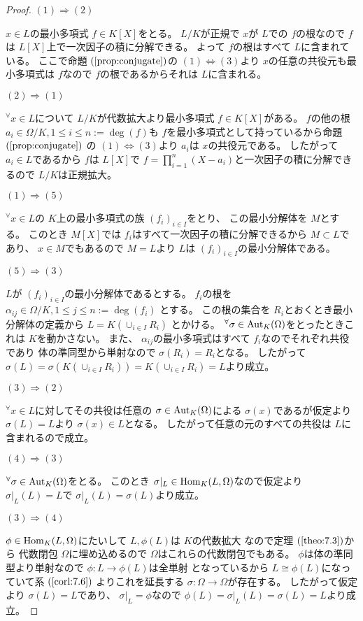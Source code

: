 \documentclass[../master_galois_theory]{subfiles}
\begin{document}
\begin{proof}
  $(1) \Rightarrow (2)$

  $x \in L$の最小多項式 $f \in K[X]$をとる。
  $L/K$が正規で $x$が $L$での $f$の根なので
  $f$は $L[X]$上で一次因子の積に分解できる。
  よって $f$の根はすべて $L$に含まれている。
  ここで命題 $(\mathrm{\ref{prop:conjugate}})$の $(1) \Leftrightarrow (3)$より
  $x$の任意の共役元も最小多項式は $f$なので $f$の根であるからそれは $L$に含まれる。

  $(2) \Rightarrow (1)$

  ${}^\forall x \in L$について $L/K$が代数拡大より最小多項式 $f \in K[X]$がある。
  $f$の他の根 $a_i \in \Omega/K , 1 \leq i \leq n := \deg(f)$も
  $f$を最小多項式として持っているから命題 $(\mathrm{\ref{prop:conjugate}})$
  の $(1) \Leftrightarrow (3)$より $a_i$は $x$の共役元である。
  したがって $a_i \in L$であるから $f$は $L[X]$で $f = \prod_{i=1}^n (X - a_i)$と一次因子の積に分解できるので $L/K$は正規拡大。

  $(1) \Rightarrow (5)$

  ${}^\forall x \in L$の $K$上の最小多項式の族 $(f_i)_{i \in I}$をとり、
  この最小分解体を $M$とする。
  このとき $M[X]$では $f_i$はすべて一次因子の積に分解できるから
  $M \subset L$であり、 $x \in M$でもあるので $M = L$より
  $L$は $(f_i)_{i \in I}$の最小分解体である。

  $(5) \Rightarrow (3)$

  $L$が $(f_i)_{i \in I}$の最小分解体であるとする。
  $f_i$の根を $\alpha_{ij} \in \Omega/K , 1 \leq j \leq n := \deg(f_i)$
  とする。
  この根の集合を $R_i$とおくとき最小分解体の定義から $L = K(\cup_{i \in I} R_i)$
  とかける。
  ${}^\forall \sigma \in \mathrm{Aut}_K(\Omega)$をとったときこれは $K$を動かさない。
  また、 $\alpha_{ij}$の最小多項式はすべて $f_i$なのでそれぞれ共役であり
  体の準同型から単射なので $\sigma(R_i) = R_i$となる。
  したがって $\sigma(L) = \sigma(K(\cup_{i \in I}R_i)) = K(\cup_{i \in I}R_i) = L$より成立。

  $(3) \Rightarrow (2)$

  ${}^\forall x \in L$に対してその共役は任意の $\sigma \in \mathrm{Aut}_K(\Omega)$による $\sigma(x)$であるが仮定より $\sigma(L) = L$より $\sigma(x) \in L$となる。
  したがって任意の元のすべての共役は $L$に含まれるので成立。

  $(4) \Rightarrow (3)$

  ${}^\forall \sigma \in \mathrm{Aut}_K(\Omega)$をとる。
  このとき $\sigma|_L \in \mathrm{Hom}_K(L,\Omega)$なので仮定より
  $\sigma|_L(L) = L$で $\sigma|_L(L) = \sigma(L)$より成立。

  $(3) \Rightarrow (4)$

  $\phi \in \mathrm{Hom}_K(L,\Omega)$にたいして $L , \phi(L)$は $K$の代数拡大
  なので定理 $(\mathrm{\ref{theo:7.3}})$から
  代数閉包 $\Omega$に埋め込めるので $\Omega$はこれらの代数閉包でもある。
  $\phi$は体の準同型より単射なので $\phi : L \longrightarrow \phi(L)$は全単射
  となっているから $L \cong \phi(L)$になっていて系 $(\mathrm{\ref{corl:7.6}})$
  よりこれを延長する $\sigma : \Omega \longrightarrow \Omega$が存在する。
  したがって仮定より $\sigma(L) = L$であり、 $\sigma|_L = \phi$なので
  $\phi(L) = \sigma|_L(L) = \sigma(L) = L$より成立。
\end{proof}
\end{document}
